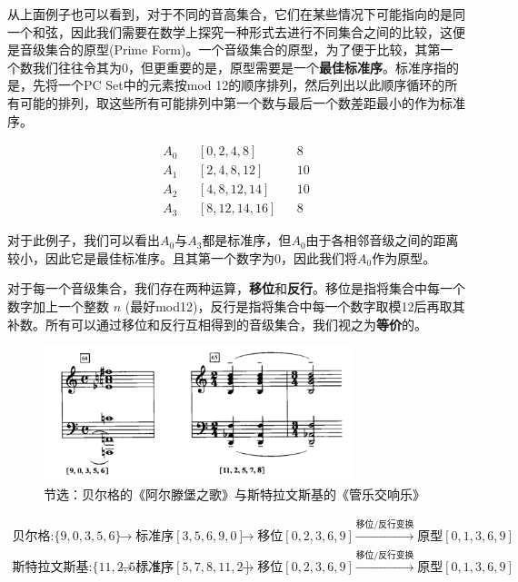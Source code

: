 \documentclass{article}
\begin{document}
从上面例子也可以看到，对于不同的音高集合，它们在某些情况下可能指向的是同一个和弦，因此我们需要在数学上探究一种形式去进行不同集合之间的比较，这便是音级集合的原型(Prime Form)。一个音级集合的原型，为了便于比较，其第一个数我们往往令其为0，但更重要的是，原型需要是一个\textbf{最佳标准序}。标准序指的是，先将一个PC Set中的元素按mod 12的顺序排列，然后列出以此顺序循环的所有可能的排列，取这些所有可能排列中第一个数与最后一个数差距最小的作为标准序。

\begin{align*}
    A_0 && [0, 2, 4, 8] && 8 \\
    A_1 && [2, 4, 8, 12] && 10 \\
    A_2 && [4, 8, 12, 14] && 10 \\
    A_3 && [8, 12, 14, 16] && 8
\end{align*}

对于此例子，我们可以看出$A_0$与$A_3$都是标准序，但$A_0$由于各相邻音级之间的距离较小，因此它是最佳标准序。且其第一个数字为0，因此我们将$A_0$作为原型。

对于每一个音级集合，我们存在两种运算，\textbf{移位}和\textbf{反行}。移位是指将集合中每一个数字加上一个整数 $n$ (最好mod12)，反行是指将集合中每一个数字取模12后再取其补数。所有可以通过移位和反行互相得到的音级集合，我们视之为\textbf{等价}的\cite{schoenberg_introduction_2014}。

\begin{figure}[h!]
    \centering
    \includegraphics[width=0.8\textwidth]{image/im2.png}
    \caption{节选：贝尔格的《阿尔滕堡之歌》与斯特拉文斯基的《管乐交响乐》}
    \label{fig:berg_stravinsky}
\end{figure}

\begin{align*}
    \textbf{贝尔格:} \{9, 0, 3, 5, 6\} & \rightarrow \textbf{标准序} [3, 5, 6, 9, 0] & \rightarrow \textbf{移位} [0, 2, 3, 6, 9] &\xrightarrow{\text{移位/反行变换}} \textbf{原型} [0, 1, 3, 6, 9] \\
    \textbf{斯特拉文斯基:} \{11, 2, 5, 7, 8\} & \rightarrow \textbf{标准序} [5, 7, 8, 11, 2] & \rightarrow \textbf{移位} [0, 2, 3, 6, 9] &\xrightarrow{\text{移位/反行变换}} \textbf{原型} [0, 1, 3, 6, 9]
\end{align*}
\end{document}
